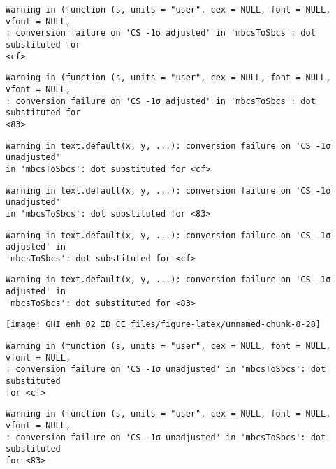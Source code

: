 \documentclass[
  10pt,
  a4paper,oneside]{article}
\begin{document}
\begin{verbatim}
Warning in (function (s, units = "user", cex = NULL, font = NULL, vfont = NULL,
: conversion failure on 'CS -1σ adjusted' in 'mbcsToSbcs': dot substituted for
<cf>
\end{verbatim}

\begin{verbatim}
Warning in (function (s, units = "user", cex = NULL, font = NULL, vfont = NULL,
: conversion failure on 'CS -1σ adjusted' in 'mbcsToSbcs': dot substituted for
<83>
\end{verbatim}

\begin{verbatim}
Warning in text.default(x, y, ...): conversion failure on 'CS -1σ unadjusted'
in 'mbcsToSbcs': dot substituted for <cf>
\end{verbatim}

\begin{verbatim}
Warning in text.default(x, y, ...): conversion failure on 'CS -1σ unadjusted'
in 'mbcsToSbcs': dot substituted for <83>
\end{verbatim}

\begin{verbatim}
Warning in text.default(x, y, ...): conversion failure on 'CS -1σ adjusted' in
'mbcsToSbcs': dot substituted for <cf>
\end{verbatim}

\begin{verbatim}
Warning in text.default(x, y, ...): conversion failure on 'CS -1σ adjusted' in
'mbcsToSbcs': dot substituted for <83>
\end{verbatim}

\begin{center}\texttt{[image: GHI\_enh\_02\_ID\_CE\_files/figure-latex/unnamed-chunk-8-28]} \end{center}

\begin{verbatim}
Warning in (function (s, units = "user", cex = NULL, font = NULL, vfont = NULL,
: conversion failure on 'CS -1σ unadjusted' in 'mbcsToSbcs': dot substituted
for <cf>
\end{verbatim}

\begin{verbatim}
Warning in (function (s, units = "user", cex = NULL, font = NULL, vfont = NULL,
: conversion failure on 'CS -1σ unadjusted' in 'mbcsToSbcs': dot substituted
for <83>
\end{verbatim}
\end{document}
